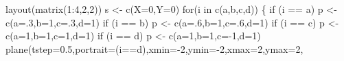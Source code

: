 \documentclass[
  letterpaper,
]{scrbook}
\newenvironment{Shaded}{\begin{snugshade}}{\end{snugshade}}
\newcommand{\AttributeTok}[1]{\textcolor[rgb]{0.40,0.45,0.13}{#1}}
\newcommand{\ControlFlowTok}[1]{\textcolor[rgb]{0.00,0.23,0.31}{#1}}
\newcommand{\DecValTok}[1]{\textcolor[rgb]{0.68,0.00,0.00}{#1}}
\newcommand{\FloatTok}[1]{\textcolor[rgb]{0.68,0.00,0.00}{#1}}
\newcommand{\FunctionTok}[1]{\textcolor[rgb]{0.28,0.35,0.67}{#1}}
\newcommand{\NormalTok}[1]{\textcolor[rgb]{0.00,0.23,0.31}{#1}}
\newcommand{\OtherTok}[1]{\textcolor[rgb]{0.00,0.23,0.31}{#1}}
\newcommand{\SpecialCharTok}[1]{\textcolor[rgb]{0.37,0.37,0.37}{#1}}
\newcommand{\StringTok}[1]{\textcolor[rgb]{0.13,0.47,0.30}{#1}}
\begin{document}
\begin{Shaded}
\begin{Highlighting}[]
\FunctionTok{layout}\NormalTok{(}\FunctionTok{matrix}\NormalTok{(}\DecValTok{1}\SpecialCharTok{:}\DecValTok{4}\NormalTok{,}\DecValTok{2}\NormalTok{,}\DecValTok{2}\NormalTok{))}
\NormalTok{s }\OtherTok{\textless{}{-}} \FunctionTok{c}\NormalTok{(}\AttributeTok{X=}\DecValTok{0}\NormalTok{,}\AttributeTok{Y=}\DecValTok{0}\NormalTok{) }
\ControlFlowTok{for}\NormalTok{(i }\ControlFlowTok{in} \FunctionTok{c}\NormalTok{(}\StringTok{\textquotesingle{}a\textquotesingle{}}\NormalTok{,}\StringTok{\textquotesingle{}b\textquotesingle{}}\NormalTok{,}\StringTok{\textquotesingle{}c\textquotesingle{}}\NormalTok{,}\StringTok{\textquotesingle{}d\textquotesingle{}}\NormalTok{))}
\NormalTok{\{}
  \ControlFlowTok{if}\NormalTok{ (i }\SpecialCharTok{==} \StringTok{\textquotesingle{}a\textquotesingle{}}\NormalTok{) p }\OtherTok{\textless{}{-}} \FunctionTok{c}\NormalTok{(}\AttributeTok{a=}\NormalTok{.}\DecValTok{3}\NormalTok{,}\AttributeTok{b=}\DecValTok{1}\NormalTok{,}\AttributeTok{c=}\NormalTok{.}\DecValTok{3}\NormalTok{,}\AttributeTok{d=}\DecValTok{1}\NormalTok{)}
  \ControlFlowTok{if}\NormalTok{ (i }\SpecialCharTok{==} \StringTok{\textquotesingle{}b\textquotesingle{}}\NormalTok{) p }\OtherTok{\textless{}{-}} \FunctionTok{c}\NormalTok{(}\AttributeTok{a=}\NormalTok{.}\DecValTok{6}\NormalTok{,}\AttributeTok{b=}\DecValTok{1}\NormalTok{,}\AttributeTok{c=}\NormalTok{.}\DecValTok{6}\NormalTok{,}\AttributeTok{d=}\DecValTok{1}\NormalTok{)}
  \ControlFlowTok{if}\NormalTok{ (i }\SpecialCharTok{==} \StringTok{\textquotesingle{}c\textquotesingle{}}\NormalTok{) p }\OtherTok{\textless{}{-}} \FunctionTok{c}\NormalTok{(}\AttributeTok{a=}\DecValTok{1}\NormalTok{,}\AttributeTok{b=}\DecValTok{1}\NormalTok{,}\AttributeTok{c=}\DecValTok{1}\NormalTok{,}\AttributeTok{d=}\DecValTok{1}\NormalTok{)}
  \ControlFlowTok{if}\NormalTok{ (i }\SpecialCharTok{==} \StringTok{\textquotesingle{}d\textquotesingle{}}\NormalTok{) p }\OtherTok{\textless{}{-}} \FunctionTok{c}\NormalTok{(}\AttributeTok{a=}\DecValTok{1}\NormalTok{,}\AttributeTok{b=}\DecValTok{1}\NormalTok{,}\AttributeTok{c=}\SpecialCharTok{{-}}\DecValTok{1}\NormalTok{,}\AttributeTok{d=}\DecValTok{1}\NormalTok{)}
  \FunctionTok{plane}\NormalTok{(}\AttributeTok{tstep=}\FloatTok{0.5}\NormalTok{,}\AttributeTok{portrait=}\NormalTok{(i}\SpecialCharTok{==}\StringTok{\textquotesingle{}d\textquotesingle{}}\NormalTok{),}\AttributeTok{xmin=}\SpecialCharTok{{-}}\DecValTok{2}\NormalTok{,}\AttributeTok{ymin=}\SpecialCharTok{{-}}\DecValTok{2}\NormalTok{,}\AttributeTok{xmax=}\DecValTok{2}\NormalTok{,}\AttributeTok{ymax=}\DecValTok{2}\NormalTok{,}

\end{Highlighting}
\end{Shaded}
\end{document}
